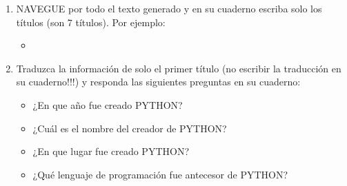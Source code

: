 \documentclass[letterpaper,10pt,spanish]{sphinxmanual}
\begin{document}
\begin{enumerate}
\begin{itemize}
\item {} 
\sphinxAtStartPar
EJECUTE el comando: . Traduzca al español la información generada y escríbala en su cuaderno.

\item {} 
\sphinxAtStartPar
EJECUTE el comando: . Se genera una texto largo en la consola.

\begin{sphinxadmonition}{note}{Navegar en textos largos en consola}
\begin{itemize}
\item {} 
\sphinxAtStartPar
Cuando se generan textos largos en la consola, para avanzar PULSE la tecla .

\item {} 
\sphinxAtStartPar
Si se quiere salir del texto largo, PULSE la tecla  y luego PULSE la tecla .

\end{itemize}
\end{sphinxadmonition}

\end{itemize}

\item {} 
\sphinxAtStartPar
NAVEGUE por todo el texto generado y en su cuaderno escriba solo los títulos (son 7 títulos). Por ejemplo:
\begin{itemize}
\item {} 
\sphinxAtStartPar
{}

\end{itemize}

\item {} 
\sphinxAtStartPar
Traduzca la información de solo el primer título  (no escribir la traducción en su cuaderno!!!) y responda las siguientes preguntas en su cuaderno:
\begin{itemize}
\item {} 
\sphinxAtStartPar
¿En que año fue creado PYTHON?

\item {} 
\sphinxAtStartPar
¿Cuál es el nombre del creador de PYTHON?

\item {} 
\sphinxAtStartPar
¿En que lugar fue creado PYTHON?

\item {} 
\sphinxAtStartPar
¿Qué lenguaje de programación fue antecesor de PYTHON?


\end{itemize}
\end{enumerate}
\end{document}
